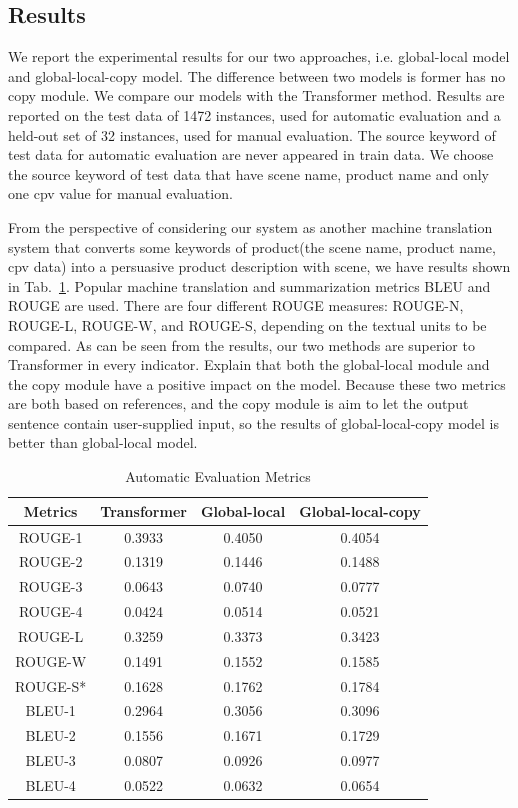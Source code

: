 \documentclass[sigconf]{acmart}
\begin{document}
\subsection{Results}
We report the experimental results for our two approaches, i.e. global-local model and global-local-copy model. The difference between two models is former has no copy module. We compare our models with the Transformer method. Results are reported on the test data of 1472 instances, used for automatic evaluation and a held-out set of 32 instances, used for manual evaluation. The source keyword of test data for automatic evaluation are never appeared in train data. We choose the source keyword of test data that have scene name, product name and only one cpv value for manual evaluation.

From the perspective of considering our system as another machine translation system that converts some keywords of product(the scene name, product name, cpv data) into a persuasive product description with scene, we have results shown in Tab.~\ref{table:evaluation-automatic}. Popular machine translation and summarization metrics BLEU and ROUGE are used. There are four different ROUGE measures: ROUGE-N, ROUGE-L, ROUGE-W, and ROUGE-S, depending on the textual units to be compared. As can be seen from the results, our two methods are superior to Transformer in every indicator. Explain that both the global-local module and the copy module have a positive impact on the model. Because these two metrics are both based on references, and the copy module is aim to let the output sentence contain user-supplied input, so the results of global-local-copy model is better than global-local model.

\begin{table}
  \caption{Automatic Evaluation Metrics}
  \label{table:evaluation-automatic}
  \begin{tabular}{c c c c}
    \toprule
    Metrics & Transformer & Global-local & Global-local-copy\\
    \midrule
    ROUGE-1 & 0.3933 & 0.4050 & 0.4054\\
    ROUGE-2 & 0.1319 & 0.1446 & 0.1488\\
    ROUGE-3 & 0.0643 & 0.0740 & 0.0777\\
    ROUGE-4 & 0.0424 & 0.0514 & 0.0521\\
    ROUGE-L & 0.3259 & 0.3373 & 0.3423\\
    ROUGE-W & 0.1491 & 0.1552 & 0.1585\\
    ROUGE-S* & 0.1628 & 0.1762 & 0.1784\\
    BLEU-1 & 0.2964 & 0.3056 & 0.3096\\
    BLEU-2 & 0.1556 & 0.1671 & 0.1729\\
    BLEU-3 & 0.0807 & 0.0926 & 0.0977\\
    BLEU-4 & 0.0522 & 0.0632 & 0.0654\\
  \bottomrule
\end{tabular}
\end{table}
\end{document}
